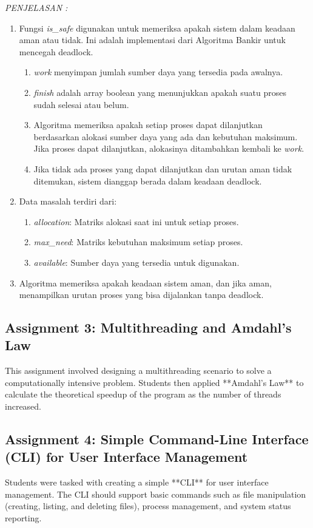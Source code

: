 \documentclass[12pt]{article}
\begin{document}
\begin{enumerate}
\textit{PENJELASAN : }
\begin{enumerate}
    \item Fungsi \textit{is\_safe} digunakan untuk memeriksa apakah sistem dalam keadaan aman atau tidak. Ini adalah implementasi dari Algoritma Bankir untuk mencegah deadlock.
        \begin{enumerate}
            \item \textit{work} menyimpan jumlah sumber daya yang tersedia pada awalnya.
            \item \textit{finish} adalah array boolean yang menunjukkan apakah suatu proses sudah selesai atau belum.
            \item Algoritma memeriksa apakah setiap proses dapat dilanjutkan berdasarkan alokasi sumber daya yang ada dan kebutuhan maksimum. Jika proses dapat dilanjutkan, alokasinya ditambahkan kembali ke \textit{work}.
            \item Jika tidak ada proses yang dapat dilanjutkan dan urutan aman tidak ditemukan, sistem dianggap berada dalam keadaan deadlock.
        \end{enumerate}
    \item Data masalah terdiri dari:
        \begin{enumerate}
            \item \textit{allocation}: Matriks alokasi saat ini untuk setiap proses.
            \item \textit{max\_need}: Matriks kebutuhan maksimum setiap proses.
            \item \textit{available}: Sumber daya yang tersedia untuk digunakan.
        \end{enumerate}
    \item Algoritma memeriksa apakah keadaan sistem aman, dan jika aman, menampilkan urutan proses yang bisa dijalankan tanpa deadlock.
\end{enumerate}
\end{enumerate}

\subsection{Assignment 3: Multithreading and Amdahl's Law}
This assignment involved designing a multithreading scenario to solve a computationally intensive problem. Students then applied **Amdahl's Law** to calculate the theoretical speedup of the program as the number of threads increased.

\subsection{Assignment 4: Simple Command-Line Interface (CLI) for User Interface Management}
Students were tasked with creating a simple **CLI** for user interface management. The CLI should support basic commands such as file manipulation (creating, listing, and deleting files), process management, and system status reporting.
\end{document}
